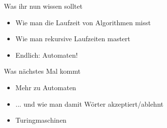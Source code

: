 \begin{frame}	
	\begin{block}{Was ihr nun wissen solltet}
		\begin{itemize}
			\item Wie man die Laufzeit von Algorithmen misst
			\item Wie man rekursive Laufzeiten mastert
			\item Endlich: Automaten!
		\end{itemize}
	\end{block}
	
	\begin{block}{Was nächstes Mal kommt}
		\begin{itemize}
			\item Mehr zu Automaten
			\item ... und wie man damit Wörter akzeptiert/ablehnt
			\item Turingmaschinen
		\end{itemize}
	\end{block}
\end{frame}





\slideThanks

